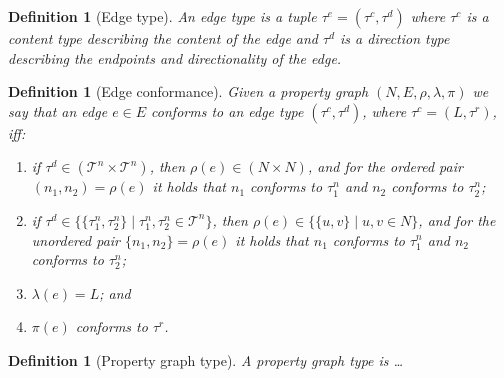 \documentclass[a4paper]{article}
\newtheorem{definition}[theorem]{Definition}
\newcommand{\rtype}{\tau^r}
\newcommand{\ctype}{\tau^c}
\newcommand{\ntype}{\tau^n}
\newcommand{\dtype}{\tau^d}
\newcommand{\etype}{\tau^e}
\begin{document}
\begin{definition}[Edge type]
  An \emph{edge type} is a tuple $\etype = (\ctype, \dtype)$ where $\ctype$ is a content type describing the content of the edge and $\dtype$ is a direction type describing the endpoints and directionality of the edge.
\end{definition}
  
\begin{definition}[Edge conformance]
  Given a property graph $(N, E, \rho, \lambda, \pi)$ we say that an edge $e \in E$ \emph{conforms} to an edge type $(\ctype, \dtype)$, where $\ctype = (L, \rtype)$, iff:
  \begin{enumerate}
    \item if $\dtype \in (\mathcal{T}^n \times \mathcal{T}^n)$, then $\rho(e) \in (N \times N)$, and for the ordered pair $(n_1, n_2) = \rho(e)$ it holds that $n_1$ conforms to $\ntype_1$ and $n_2$ conforms to $\ntype_2$;
    \item if $\dtype \in \{\{\ntype_1, \ntype_2\} \mid \ntype_1, \ntype_2 \in \mathcal{T}^n\}$, then $\rho(e) \in \{\{u, v\} \mid u, v \in N\}$, and for the unordered pair $\{n_1, n_2\} = \rho(e)$ it holds that $n_1$ conforms to $\ntype_1$ and $n_2$ conforms to $\ntype_2$;
    \item $\lambda(e) = L$; and
    \item $\pi(e)$ conforms to $\rtype$.
  \end{enumerate}
\end{definition}

\begin{definition}[Property graph type]
  A \emph{property graph type} is \ldots
\end{definition}
\end{document}
